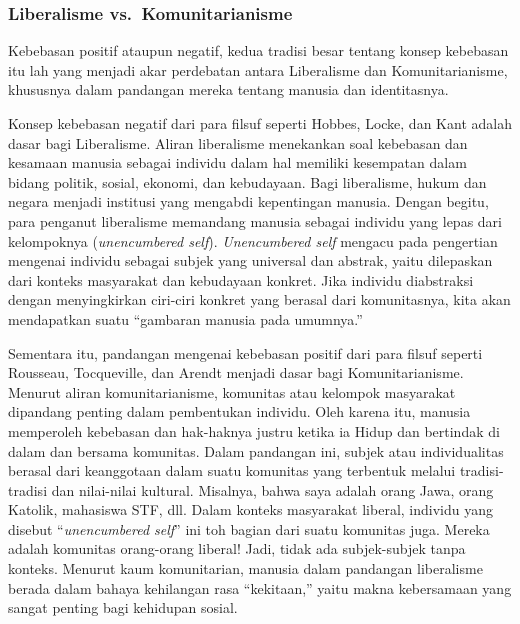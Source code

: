 \documentclass[10pt,a4paper]{article}
\begin{document}
\begin{multicols}{2}
\hypertarget{liberalisme-vs.-komunitarianisme}{%
\subsubsection{Liberalisme
vs.~Komunitarianisme}\label{liberalisme-vs.-komunitarianisme}}

Kebebasan positif ataupun negatif, kedua tradisi besar tentang konsep
kebebasan itu lah yang menjadi akar perdebatan antara Liberalisme dan
Komunitarianisme, khususnya dalam pandangan mereka tentang manusia dan
identitasnya.

Konsep kebebasan negatif dari para filsuf seperti Hobbes, Locke, dan
Kant adalah dasar bagi Liberalisme. Aliran liberalisme menekankan soal
kebebasan dan kesamaan manusia sebagai individu dalam hal memiliki
kesempatan dalam bidang politik, sosial, ekonomi, dan kebudayaan. Bagi
liberalisme, hukum dan negara menjadi institusi yang mengabdi
kepentingan manusia. Dengan begitu, para penganut liberalisme memandang
manusia sebagai individu yang lepas dari kelompoknya (\emph{unencumbered
self}). \emph{Unencumbered self} mengacu pada pengertian mengenai
individu sebagai subjek yang universal dan abstrak, yaitu dilepaskan
dari konteks masyarakat dan kebudayaan konkret. Jika individu
diabstraksi dengan menyingkirkan ciri-ciri konkret yang berasal dari
komunitasnya, kita akan mendapatkan suatu ``gambaran manusia pada
umumnya.''

Sementara itu, pandangan mengenai kebebasan positif dari para filsuf
seperti Rousseau, Tocqueville, dan Arendt menjadi dasar bagi
Komunitarianisme. Menurut aliran komunitarianisme, komunitas atau
kelompok masyarakat dipandang penting dalam pembentukan individu. Oleh
karena itu, manusia memperoleh kebebasan dan hak-haknya justru ketika ia
Hidup dan bertindak di dalam dan bersama komunitas. Dalam pandangan ini,
subjek atau individualitas berasal dari keanggotaan dalam suatu
komunitas yang terbentuk melalui tradisi-tradisi dan nilai-nilai
kultural. Misalnya, bahwa saya adalah orang Jawa, orang Katolik,
mahasiswa STF, dll. Dalam konteks masyarakat liberal, individu yang
disebut ``\emph{unencumbered self}'' ini toh bagian dari suatu komunitas
juga. Mereka adalah komunitas orang-orang liberal! Jadi, tidak ada
subjek-subjek tanpa konteks. Menurut kaum komunitarian, manusia dalam
pandangan liberalisme berada dalam bahaya kehilangan rasa ``kekitaan,''
yaitu makna kebersamaan yang sangat penting bagi kehidupan sosial.

\hypertarget{masalah-identitas-dalam-pandangan-liberalisme-dan-komunitarianisme}{%
}
\end{multicols}
\end{document}
